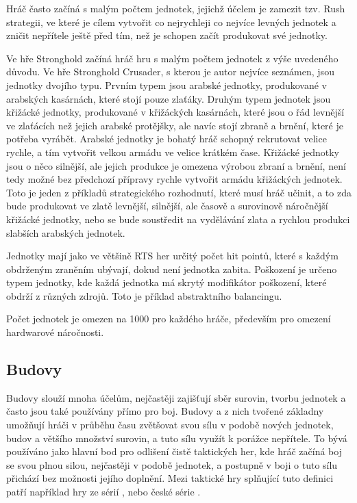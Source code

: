Hráč často začíná s malým počtem jednotek, jejichž účelem je zamezit tzv. Rush strategii, ve které je cílem vytvořit co nejrychleji co nejvíce levných jednotek a zničit nepřítele ještě před tím, než je schopen začít produkovat své jednotky.

Ve hře Stronghold začíná hráč hru s malým počtem jednotek z výše uvedeného důvodu. Ve hře Stronghold Crusader, s kterou je autor nejvíce seznámen, jsou jednotky dvojího typu. Prvním typem jsou arabské jednotky, produkované v arabských kasárnách, které stojí pouze zlaťáky. Druhým typem jednotek jsou křižácké jednotky, produkované v křižáckých kasárnách, které jsou o řád levnější ve zlaťácích než jejich arabské protějšky, ale navíc stojí zbraně a brnění, které je potřeba vyrábět. Arabské jednotky je bohatý hráč schopný rekrutovat velice rychle, a tím vytvořit velkou armádu ve velice krátkém čase. Křižácké jednotky jsou o něco silnější, ale jejich produkce je omezena výrobou zbraní a brnění, není tedy možné bez předchozí přípravy rychle vytvořit armádu křižáckých jednotek. Toto je jeden z příkladů strategického rozhodnutí, které musí hráč učinit, a to zda bude produkovat ve zlatě levnější, silnější, ale časově a surovinově náročnější křižácké jednotky, nebo se bude soustředit na vydělávání zlata a rychlou produkci slabších arabských jednotek. 

Jednotky mají jako ve většině RTS her určitý počet hit pointů, které s každým obdrženým zraněním ubývají, dokud není jednotka zabita. Poškození je určeno typem jednotky, kde každá jednotka má skrytý modifikátor poškození, které obdrží z různých zdrojů.
 Toto je příklad abstraktního balancingu.

Počet jednotek je omezen na 1000 pro každého hráče, především pro omezení hardwarové náročnosti. 

\subsection{Budovy}
Budovy slouží mnoha účelům, nejčastěji zajišťují sběr surovin, tvorbu jednotek a často jsou také používány přímo pro boj. Budovy a z nich tvořené základny umožňují hráči v průběhu času zvětšovat svou sílu v podobě nových jednotek, budov a většího množství surovin, a tuto sílu využít k porážce nepřítele. To bývá používáno jako hlavní bod pro odlišení čistě taktických her, kde hráč začíná boj se svou plnou silou, nejčastěji v podobě jednotek, a postupně v boji o tuto sílu přichází bez možnosti jejího doplnění. Mezi taktické hry splňující tuto definici patří například hry ze sérií \cite{Total War}, \cite{X-COM} nebo české série \cite{UFO}.

